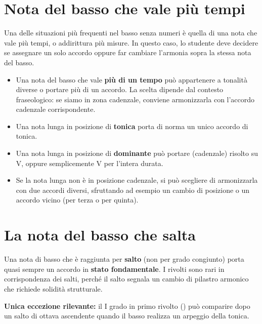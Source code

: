 \section{Nota del basso che vale più tempi}
\label{sec:nota_piu_tempi}

Una delle situazioni più frequenti nel basso senza numeri è quella di una nota che vale più tempi, o addirittura più misure. In questo caso, lo studente deve decidere se assegnare un solo accordo oppure far cambiare l'armonia sopra la stessa nota del basso.

\begin{regola}
	\label{reg:nota_piu_tempi}
	\begin{itemize}
		\item Una nota del basso che vale \textbf{più di un tempo} può appartenere a tonalità diverse o portare più di un accordo. La scelta dipende dal contesto fraseologico: se siamo in zona cadenzale, conviene armonizzarla con l'accordo cadenzale corrispondente.
		\item Una nota lunga in posizione di \textbf{tonica} porta di norma un unico accordo di tonica.
		\item Una nota lunga in posizione di \textbf{dominante} può portare  (cadenzale) risolto su V, oppure semplicemente V per l'intera durata.
		\item Se la nota lunga non è in posizione cadenzale, si può scegliere di armonizzarla con due accordi diversi, sfruttando ad esempio un cambio di posizione o un accordo vicino (per terza o per quinta).
	\end{itemize}
\end{regola}

\section{La nota del basso che salta}
\label{sec:nota_salta}

\begin{regola}
	\label{reg:nota_salta_stati_fondamentali}
	Una nota di basso che è raggiunta per \textbf{salto} (non per grado congiunto) porta quasi sempre un accordo in \textbf{stato fondamentale}. I rivolti sono rari in corrispondenza dei salti, perché il salto segnala un cambio di pilastro armonico che richiede solidità strutturale.
	
	\textbf{Unica eccezione rilevante:} il I grado in primo rivolto () può comparire dopo un salto di ottava ascendente quando il basso realizza un arpeggio della tonica.
\end{regola}

